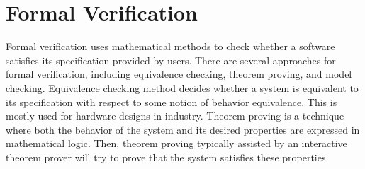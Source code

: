 \section*{Formal Verification} 

Formal verification uses mathematical methods to check whether a software satisfies its specification provided by users. 
%
There are several approaches for formal verification, including equivalence checking, theorem proving, and model checking. Equivalence checking method decides whether a system is equivalent to its specification with respect to some notion of behavior equivalence. This is mostly used for hardware designs in industry. Theorem proving is a technique where both the behavior of the system and its desired properties are expressed in mathematical logic. Then, theorem proving typically assisted by an interactive theorem prover will try to prove that the system satisfies these properties. 

